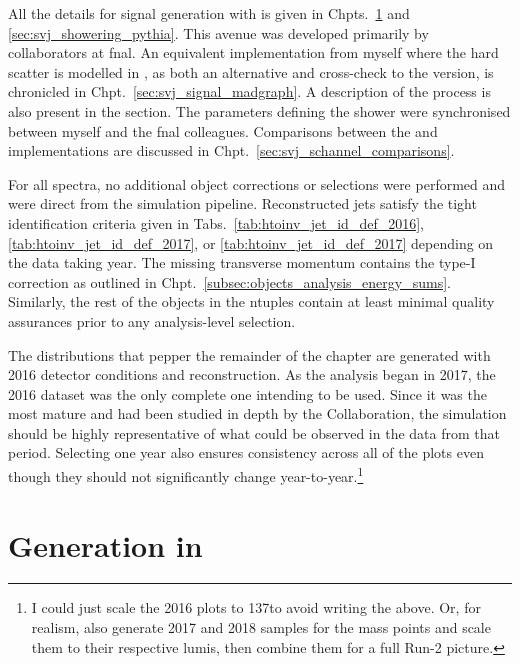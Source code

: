 All the details for \schannel signal generation with \PYTHIAEIGHT is given in Chpts.~\ref{sec:svj_signal_pythia} and \ref{sec:svj_showering_pythia}. This avenue was developed primarily by collaborators at \acrshort{fnal}. An equivalent implementation from myself where the hard scatter is modelled in \MGvATNLO, as both an alternative and cross-check to the \PYTHIA version, is chronicled in Chpt.~\ref{sec:svj_signal_madgraph}. A description of the \tchannel process is also present in the section. The parameters defining the shower were synchronised between myself and the \acrshort{fnal} colleagues. Comparisons between the \PYTHIA and \MADGRAPH implementations are discussed in Chpt.~\ref{sec:svj_schannel_comparisons}.

For all spectra, no additional object corrections or selections were performed and were direct from the simulation pipeline. Reconstructed \glspl{jet} satisfy the tight identification criteria given in Tabs.~\ref{tab:htoinv_jet_id_def_2016}, \ref{tab:htoinv_jet_id_def_2017}, or \ref{tab:htoinv_jet_id_def_2017} depending on the data taking year. The missing transverse momentum \ptmiss contains the type-I correction as outlined in Chpt.~\ref{subsec:objects_analysis_energy_sums}. Similarly, the rest of the objects in the ntuples contain at least minimal quality assurances prior to any analysis-level selection.

The distributions that pepper the remainder of the chapter are generated with 2016 detector conditions and reconstruction. As the analysis began in 2017, the 2016 dataset was the only complete one intending to be used. Since it was the most mature and had been studied in depth by the Collaboration, the simulation should be highly representative of what could be observed in the data from that period. Selecting one year also ensures consistency across all of the plots even though they should not significantly change year-to-year.\footnote{I could just scale the 2016 plots to 137\fbinv to avoid writing the above. Or, for realism, also generate 2017 and 2018 samples for the mass points and scale them to their respective lumis, then combine them for a full Run-2 picture.}




\section{Generation in \texorpdfstring{\PYTHIA}{Pythia}}
\label{sec:svj_signal_pythia}

